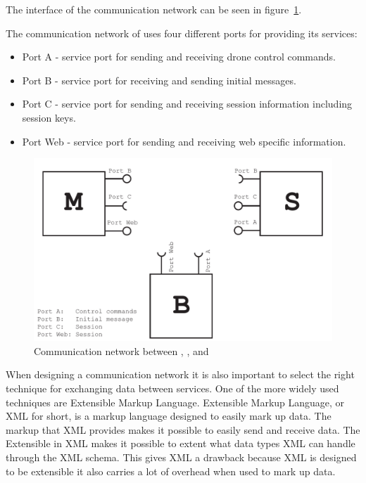 The interface of the communication network can be seen in figure~\ref{fig:communication_network}.

The communication network of \projectname{} uses four different ports for providing its services:

\begin{itemize}
	\item Port A - service port for sending and receiving drone control commands.
	\item Port B - service port for receiving and sending initial messages.
	\item Port C - service port for sending and receiving session information including session keys.
	\item Port Web - service port for sending and receiving web specific information.
\end{itemize}

\begin{figure}[!h]
    \centering 
    \includegraphics[width=\textwidth]{gfx/communication_network.pdf}
    \caption{Communication network between , , and }
    \label{fig:communication_network}
\end{figure}

When designing a communication network it is also important to select the right technique for exchanging data between services.
One of the more widely used techniques are Extensible Markup Language.
Extensible Markup Language, or XML for short, is a markup language designed to easily mark up data.
The markup that XML provides makes it possible to easily send and receive data.
The Extensible in XML makes it possible to extent what data types XML can handle through the XML schema. \citep{simonstl}
This gives XML a drawback because XML is designed to be extensible it also carries a lot of overhead when used to mark up data.

